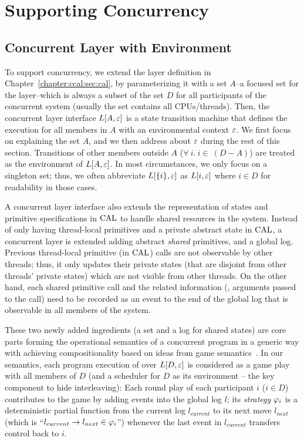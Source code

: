 \section{Supporting Concurrency}
\label{chapter:ccal:sec:ccal-overview}

\subsection{Concurrent Layer with Environment}
\label{chapter:ccal:subsec:concurrent-layer-with-environment}

To support concurrency, 
we extend the layer definition in Chapter~\ref{chapter:ccal:sec:cal},
by parameterizing it with a set $A$--a focused set for the layer--which is always a subset of the set $D$ for all participants of the concurrent system (usually the set contains all CPUs/threads).
Then, the concurrent layer interface $L[A, {\varepsilon}]$ is a state transition machine
that defines the execution for all members in $A$ with an environmental context ${\varepsilon}$.
We first focus on explaining the set $A$, and we then address about ${\varepsilon}$ during the rest of this section.
Transitions of other members outside $A$  ($\forall \ i . \ i \in\ (D - A)$)
are treated as the environment of $L[A, {\varepsilon}]$. 
In most circumstances, we only focus on a singleton set; 
thus, we often abbreviate $L[\{i\},{\varepsilon}]$ as $L[i, {\varepsilon}]$ where $i\in{}D$ for readability in those cases.

A concurrent layer interface also extends the representation of states and primitive specifications in $\mathrm{CAL}$ to handle shared resources in the system. 
Instead of only having thread-local primitives and a private abstract state in $\mathrm{CAL}$, 
a concurrent layer is extended adding abstract \textit{shared} primitives, 
and a global log. 
Previous thread-local primitive (in $\mathrm{CAL}$) calls are not observable by other threads; thus, it only updates their private states (that are disjoint from other threads' private states) which are not visible from other threads. 
On the other hand, each shared primitive call and the related information (\ie, arguments passed to the call) 
need to be recorded as an event to the end of the global log that
is observable in all members of the system.

These two newly added ingredients (a set and a log for shared states)  are core parts forming the operational semantics of a concurrent program 
 in a generic way with achieving  compositionality based on
ideas from game semantics~\cite{gsinvite}. 
In our semantics, 
each program execution of  over 
$L[D, {\varepsilon}]$ is considered as a game play with all members of $D$ 
(and a scheduler for $D$ as its environment -- the key component to hide interleaving):
Each round play of each participant $i$ ($i\in{}D$) contributes to the game 
by adding events into the global log $l$; its {\em strategy}
$\varphi_{i}$ is a deterministic partial function from
the current log $l_{current}$ to its next move $l_{next}$ (which is ``$l_{current} \rightarrow l_{next} \in \varphi_{i}$'') whenever
the last event in $l_{current}$ transfers control back to $i$. 

